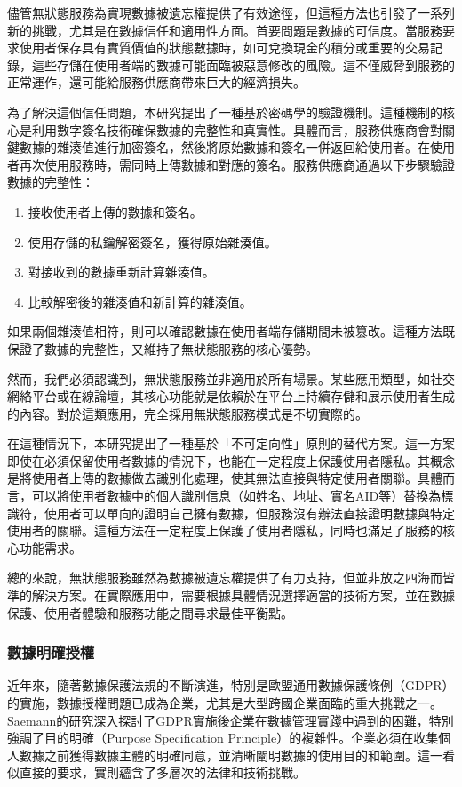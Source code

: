 儘管無狀態服務為實現數據被遺忘權提供了有效途徑，但這種方法也引發了一系列新的挑戰，尤其是在數據信任和適用性方面。首要問題是數據的可信度。當服務要求使用者保存具有實質價值的狀態數據時，如可兌換現金的積分或重要的交易記錄，這些存儲在使用者端的數據可能面臨被惡意修改的風險。這不僅威脅到服務的正常運作，還可能給服務供應商帶來巨大的經濟損失。

為了解決這個信任問題，本研究提出了一種基於密碼學的驗證機制。這種機制的核心是利用數字簽名技術確保數據的完整性和真實性。具體而言，服務供應商會對關鍵數據的雜湊值進行加密簽名，然後將原始數據和簽名一併返回給使用者。在使用者再次使用服務時，需同時上傳數據和對應的簽名。服務供應商通過以下步驟驗證數據的完整性：
\begin{enumerate}
  \item 接收使用者上傳的數據和簽名。
  \item 使用存儲的私鑰解密簽名，獲得原始雜湊值。
  \item 對接收到的數據重新計算雜湊值。
  \item 比較解密後的雜湊值和新計算的雜湊值。
\end{enumerate}
如果兩個雜湊值相符，則可以確認數據在使用者端存儲期間未被篡改。這種方法既保證了數據的完整性，又維持了無狀態服務的核心優勢。

然而，我們必須認識到，無狀態服務並非適用於所有場景。某些應用類型，如社交網絡平台或在線論壇，其核心功能就是依賴於在平台上持續存儲和展示使用者生成的內容。對於這類應用，完全採用無狀態服務模式是不切實際的。

在這種情況下，本研究提出了一種基於「不可定向性」原則的替代方案。這一方案即使在必須保留使用者數據的情況下，也能在一定程度上保護使用者隱私。其概念是將使用者上傳的數據做去識別化處理，使其無法直接與特定使用者關聯。具體而言，可以將使用者數據中的個人識別信息（如姓名、地址、實名AID等）替換為標識符，使用者可以單向的證明自己擁有數據，但服務沒有辦法直接證明數據與特定使用者的關聯。這種方法在一定程度上保護了使用者隱私，同時也滿足了服務的核心功能需求。

總的來說，無狀態服務雖然為數據被遺忘權提供了有力支持，但並非放之四海而皆準的解決方案。在實際應用中，需要根據具體情況選擇適當的技術方案，並在數據保護、使用者體驗和服務功能之間尋求最佳平衡點。
\subsubsection{數據明確授權}
近年來，隨著數據保護法規的不斷演進，特別是歐盟通用數據保護條例（GDPR）的實施，數據授權問題已成為企業，尤其是大型跨國企業面臨的重大挑戰之一。Saemann\cite{saemann2022investigating}的研究深入探討了GDPR實施後企業在數據管理實踐中遇到的困難，特別強調了目的明確（Purpose Specification Principle）的複雜性。企業必須在收集個人數據之前獲得數據主體的明確同意，並清晰闡明數據的使用目的和範圍。這一看似直接的要求，實則蘊含了多層次的法律和技術挑戰。

